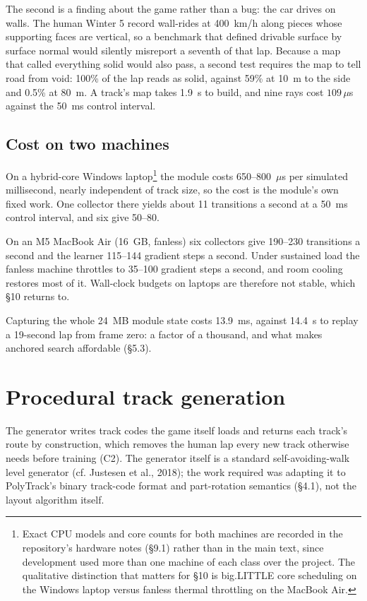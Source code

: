 \documentclass[11pt]{article}
\begin{document}
The second is a finding about the game rather than a bug: the car drives on walls. The human Winter 5 record wall-rides at 400~km/h along pieces whose supporting faces are vertical, so a benchmark that defined drivable surface by surface normal would silently misreport a seventh of that lap. Because a map that called everything solid would also pass, a second test requires the map to tell road from void: 100\% of the lap reads as solid, against 59\% at 10~m to the side and 0.5\% at 80~m. A track's map takes 1.9~s to build, and nine rays cost $109\,\mu$s against the 50~ms control interval.

\subsection{Cost on two machines}

On a hybrid-core Windows laptop\footnote{Exact CPU models and core counts for both machines are recorded in the repository's hardware notes (\S9.1) rather than in the main text, since development used more than one machine of each class over the project. The qualitative distinction that matters for \S10 is big.LITTLE core scheduling on the Windows laptop versus fanless thermal throttling on the MacBook Air.} the module costs 650--800~$\mu$s per simulated millisecond, nearly independent of track size, so the cost is the module's own fixed work. One collector there yields about 11 transitions a second at a 50~ms control interval, and six give 50--80.

On an M5 MacBook Air (16~GB, fanless) six collectors give 190--230 transitions a second and the learner 115--144 gradient steps a second. Under sustained load the fanless machine throttles to 35--100 gradient steps a second, and room cooling restores most of it. Wall-clock budgets on laptops are therefore not stable, which \S10 returns to.

Capturing the whole 24~MB module state costs 13.9~ms, against 14.4~s to replay a 19-second lap from frame zero: a factor of a thousand, and what makes anchored search affordable (\S5.3).

\section{Procedural track generation}

The generator writes track codes the game itself loads and returns each track's route by construction, which removes the human lap every new track otherwise needs before training (C2). The generator itself is a standard self-avoiding-walk level generator (cf. Justesen et al., 2018); the work required was adapting it to PolyTrack's binary track-code format and part-rotation semantics (\S4.1), not the layout algorithm itself.
\end{document}
